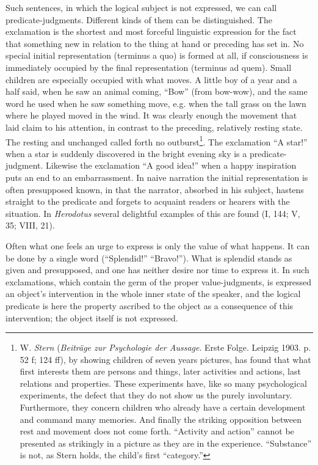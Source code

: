 \documentclass[12pt,a4paper]{book}
\newcommand{\opage}[1]{\marginnote{\footnotesize\textit{[#1]}}}
\begin{document}
Such sentences, in which the logical subject is not expressed, we can call
predicate-judgments. Different kinds of them can be distinguished. The
exclamation is the shortest and most forceful linguistic expression for
the fact that something new in relation to the thing at hand or preceding
has set in. No special initial representation (terminus a quo) is formed
at all, if consciousness is immediately occupied by the final
representation (terminus ad quem). Small children are especially occupied
with what moves. A little boy of a year and a half said, when he saw an
animal coming, ``Bow'' (from bow-wow), and the same word he used when he
saw something move, e.g. when the tall grass on the lawn where he played
moved in the \opage{85}wind. It was clearly enough the movement that laid claim to
his attention, in contrast to the preceding, relatively resting state. The
resting and unchanged called forth no outburst\footnote{W. \emph{Stern}
(\emph{Beiträge zur Psychologie der Aussage}. Erste Folge. Leipzig 1903.
p. 52 f; 124 ff), by showing children of seven years pictures, has found
that what first interests them are persons and things, later activities
and actions, last relations and properties. These experiments have, like
so many psychological experiments, the defect that they do not show us the
purely involuntary. Furthermore, they concern children who already have a
certain development and command many memories. And finally the striking
opposition between rest and movement does not come forth. ``Activity and
action'' cannot be presented as strikingly in a picture as they are in the
experience. ``Substance'' is not, as Stern holds, the child's first
``category.''}. The exclamation ``A star!'' when a star is suddenly
discovered in the bright evening sky is a predicate-judgment. Likewise the
exclamation ``A good idea!'' when a happy inspiration puts an end to an
embarrassment. In naive narration the initial representation is often
presupposed known, in that the narrator, absorbed in his subject, hastens
straight to the predicate and forgets to acquaint readers or hearers with
the situation. In \emph{Herodotus} several delightful examples of this are
found (I, 144; V, 35; VIII, 21).

Often what one feels an urge to express is only the value of what happens.
It can be done by a single word (``Splendid!'' ``Bravo!''). What is
splendid stands as given and presupposed, and one has neither desire nor
time to express it. In such exclamations, which contain the germ of the
proper value-judgments, is expressed an object's intervention in the whole
inner state of the speaker, and the logical predicate is here the property
ascribed to the object as a consequence of this intervention; the object
itself is not expressed.
\end{document}
